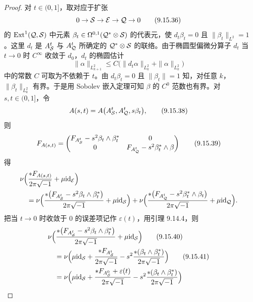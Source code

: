 \begin{proof}
  对 $t\in(0,1]$，取对应于扩张
  \begin{equation}
    0\to\mathcal{S}\to\mathcal{E}\to\mathcal{Q}\to0
    \tag{9.15.36}
  \end{equation}
  的 $\operatorname{Ext}^1(\mathcal{Q},\mathcal{S})$ 中元素 $\beta_t\in\Omega^{0,1}(\mathcal{Q}^*\otimes\mathcal{S})$ 的代表元，使 $d_t\beta_t=0$ 且 $\|\beta_t\|_{L^2}=1$。这里 $d_t$ 是 $A^t_{\mathcal{S}}$ 与 $A^t_{\mathcal{Q}}$ 所确定的 $\mathcal{Q}^*\otimes\mathcal{S}$ 的联络。由于椭圆型偏微分算子 $d_t$ 当 $t\to0$ 时 $C^\infty$ 收敛于 $d_0$，$d_t$ 的椭圆估计
  \begin{equation}
    \|\alpha\|_{L^2_{k+1}}\le C\bigl(\|d_t\alpha\|_{L^2_k}+\|\alpha\|_{L^2_k}\bigr)
    \tag{9.15.37}
  \end{equation}
  中的常数 $C$ 可取为不依赖于 $t$。由 $d_t\beta_t=0$ 且 $\|\beta_t\|=1$ 知，对任意 $k$，$\|\beta_t\|_{L^2_k}$ 有界。于是用 Sobolev 嵌入定理可知 $\beta$ 的 $C^0$ 范数也有界。对 $s,t\in(0,1]$，令
  \begin{equation}
    A(s,t)=A\bigl(A^t_{\mathcal{S}},A^t_{\mathcal{Q}},s\beta_t\bigr),
    \tag{9.15.38}
  \end{equation}
  则
  \begin{equation}
    F_{A(s,t)}=
    \begin{pmatrix}
      F_{A^t_{\mathcal{S}}}-s^2\beta_t\wedge\beta_t^* & 0\\
      0 & F_{A^t_{\mathcal{Q}}}-s^2\beta_t^*\wedge\beta
    \end{pmatrix}
    \tag{9.15.39}
  \end{equation}
  得
  \begin{align*}
    &\nu\Bigl(\frac{\ast F_{A(s,t)}}{2\pi\sqrt{-1}}+\mu\mathrm{id}_{\mathcal{E}}\Bigr)\\
    &\quad=\nu\Bigl(\frac{\ast\bigl(F_{A^t_{\mathcal{S}}}-s^2\beta_t\wedge\beta_t^*\bigr)}{2\pi\sqrt{-1}}+\mu\mathrm{id}_{\mathcal{S}}\Bigr)
      +\nu\Bigl(\frac{\ast\bigl(F_{A^t_{\mathcal{Q}}}-s^2\beta_t^*\wedge\beta_t\bigr)}{2\pi\sqrt{-1}}+\mu\mathrm{id}_{\mathcal{Q}}\Bigr).
  \end{align*}
  把当 $t\to0$ 时收敛于 $0$ 的误差项记作 $\varepsilon(t)$，用引理 9.14.4，则
  \begin{align}
    &\nu\Bigl(\frac{\ast\bigl(F_{A^t_{\cS}}-s^2\beta_t\wedge\beta_t^*\bigr)}{2\pi\sqrt{-1}}+\mu\id_{\cS}\Bigr)
    \tag{9.15.40}\\
    &\quad=\nu\Bigl(\mu\id_{\cS}+\frac{\ast F_{A^t_{\cS}}}{2\pi\sqrt{-1}}
      -s^2\frac{\ast(\beta_t\wedge\beta_t^*)}{2\pi\sqrt{-1}}\Bigr)
    \tag{9.15.41}\\
    &\quad=\nu\Bigl(\mu\id_{\cS}+\frac{\ast F_{A^0_{\cS}}+\varepsilon(t)}{2\pi\sqrt{-1}}
      -s^2\frac{\ast(\beta_t\wedge\beta_t^*)}{2\pi\sqrt{-1}}\Bigr)

\end{align}
\end{proof}
